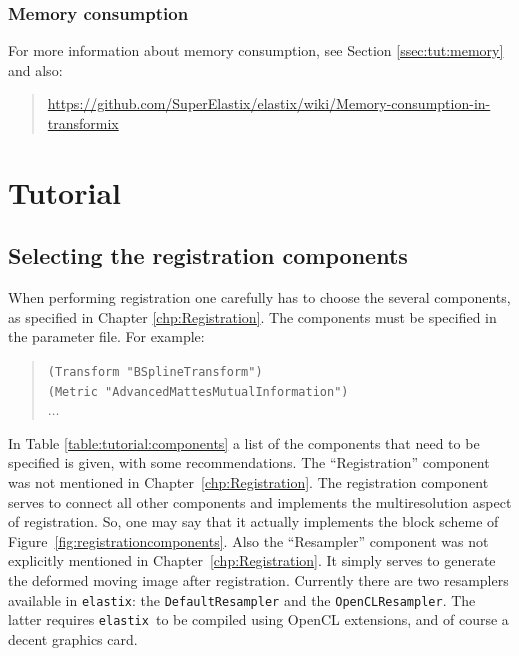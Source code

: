 \documentclass[]{report}
\newcommand{\elastix}{\texttt{elastix}}
\begin{document}
\subsection{Memory consumption}

For more information about memory consumption, see Section
\ref{ssec:tut:memory} and also:
\begin{quote}
\url{https://github.com/SuperElastix/elastix/wiki/Memory-consumption-in-transformix}
\end{quote}


\chapter{Tutorial}\label{chp:Tutorial}


\section{Selecting the registration components}

When performing registration one carefully has to choose the
several components, as specified in Chapter
\ref{chp:Registration}. The components must be specified in the
parameter file. For example:
\begin{quote}
\texttt{(Transform "BSplineTransform")}\\
\texttt{(Metric "AdvancedMattesMutualInformation")}\\
$\ldots$
\end{quote}

In Table \ref{table:tutorial:components} a list of the components
that need to be specified is given, with some recommendations. The
``Registration'' component was not mentioned in
Chapter~\ref{chp:Registration}. The registration component serves to
connect all other components and implements the multiresolution
aspect of registration. So, one may say that it actually implements
the block scheme of Figure~\ref{fig:registrationcomponents}. Also
the ``Resampler'' component was not explicitly mentioned in
Chapter~\ref{chp:Registration}. It simply serves to generate the
deformed moving image after registration. Currently there are two
resamplers available in \elastix: the \texttt{DefaultResampler} and
the \texttt{OpenCLResampler}. The latter requires \elastix\ to be
compiled using OpenCL extensions, and of course a decent graphics
card.
\end{document}

